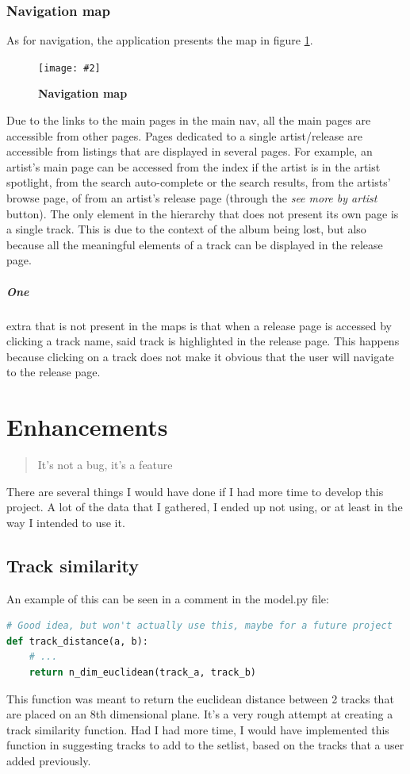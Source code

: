 \documentclass[10pt, a4paper]{article}
\newcommand{\figuremacro}[5]{
    \begin{figure}[#1]
        \centering
        \texttt{[image: \#2]}
        \caption[#3]{\textbf{#3}#4}
        \label{fig:#2}
    \end{figure}
}
\begin{document}
	 \subsubsection{Navigation map}
	 As for navigation, the application presents the map in figure \ref{fig:nav-map}.
	 
	 \figuremacro{h}{nav-map}{Navigation map}{}{1.0}
	 
	 Due to the links to the main pages in the main nav, all the main pages are accessible from other pages. Pages dedicated to a single artist/release are accessible from listings that are displayed in several pages.
	 For example, an artist's main page can be accessed from the index if the artist is in the artist spotlight, from the search auto-complete or the search results, from the artists' browse page, of from an artist's release page (through the \textit{see more by artist} button).
	 The only element in the hierarchy that does not present its own page is a single track. This is due to the context of the album being lost, but also because all the meaningful elements of a track can be displayed in the release page.
	 \subparagraph{One} extra that is not present in the maps is that when a release page is accessed by clicking a track name, said track is highlighted in the release page. This happens because clicking on a track does not make it obvious that the user will navigate to the release page.
	 
\section{Enhancements}
\label{sec:enhancements}
\blockquote{It's not a bug, it's a feature}

	There are several things I would have done if I had more time to develop this project. A lot of the data that I gathered, I ended up not using, or at least in the way I intended to use it. 
	
	\subsection{Track similarity}	
	An example of this can be seen in a comment in the model.py file:
\begin{lstlisting}[language = Python, caption = Track distance function definition]
# Good idea, but won't actually use this, maybe for a future project
def track_distance(a, b):
	# ...
	return n_dim_euclidean(track_a, track_b)
\end{lstlisting} 
	This function was meant to return the euclidean distance between 2 tracks that are placed on an 8th dimensional plane. It's a very rough attempt at creating a track similarity function. Had I had more time, I would have implemented this function in suggesting tracks to add to the setlist, based on the tracks that a user added previously.
\end{document}
